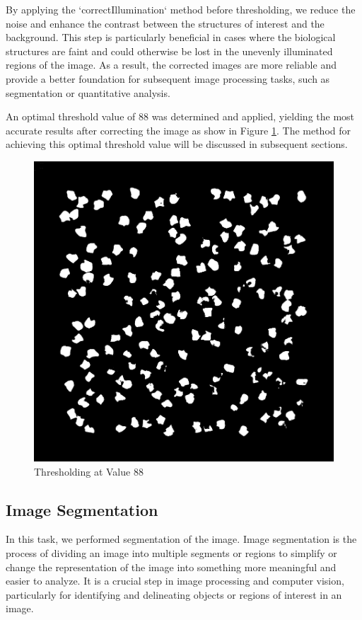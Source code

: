 \documentclass[%
	a4paper, %
	12pt, %
	english, %
	bibtotoc %
]{scrartcl}
\newcommand{\todo}[1]{{\color{blue}{TODO: {#1}}}}
\begin{document}
By applying the `correctIllumination` method before thresholding, we reduce the noise and enhance the contrast between the structures of interest and the background. This step is particularly beneficial in cases where the biological structures are faint and could otherwise be lost in the unevenly illuminated regions of the image. As a result, the corrected images are more reliable and provide a better foundation for subsequent image processing tasks, such as segmentation or quantitative analysis. 

An optimal threshold value of 88 was determined and applied, yielding the most accurate results after correcting the image as show in Figure \ref{fig:figure88thresholding}. The method for achieving this optimal threshold value will be discussed in subsequent sections.
 



\begin{figure}[h!]
    \centering
    \includegraphics[width=0.3\linewidth]{latex-template-ss24/images/88_thresholded_corrected_illumination.png}
    \caption{Thresholding at Value 88}
    \label{fig:figure88thresholding}
\end{figure}



\subsection{Image Segmentation}
In this task, we performed segmentation of the image. Image segmentation is the process of dividing an image into multiple segments or regions to simplify or change the representation of the image into something more meaningful and easier to analyze. It is a crucial step in image processing and computer vision, particularly for identifying and delineating objects or regions of interest in an image.
\end{document}
